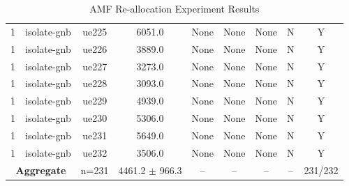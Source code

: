 \begin{table}[ht]
\begin{tabular}{|c|c|c|c|c|c|c|c|c|}
1 & isolate-gnb & ue225 & 6051.0 & None & None & None & N & Y \\
1 & isolate-gnb & ue226 & 3889.0 & None & None & None & N & Y \\
1 & isolate-gnb & ue227 & 3273.0 & None & None & None & N & Y \\
1 & isolate-gnb & ue228 & 3093.0 & None & None & None & N & Y \\
1 & isolate-gnb & ue229 & 4939.0 & None & None & None & N & Y \\
1 & isolate-gnb & ue230 & 5306.0 & None & None & None & N & Y \\
1 & isolate-gnb & ue231 & 5649.0 & None & None & None & N & Y \\
1 & isolate-gnb & ue232 & 3506.0 & None & None & None & N & Y \\
\multicolumn{2}{|c|}{\textbf{Aggregate}} & n=231 & 4461.2 $\pm$ 966.3 & -- & -- & -- & -- & 231/232 \\
\hline
\end{tabular}
\caption{AMF Re-allocation Experiment Results}
\label{tab:amf_realloc}
\end{table}
